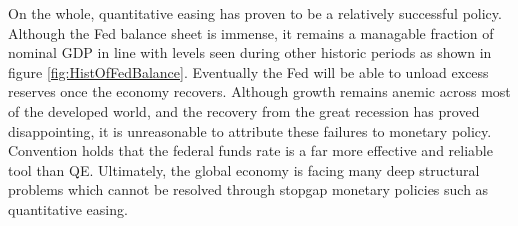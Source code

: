 \documentclass[12pt]{report}
\begin{document}
On the whole, quantitative easing has proven to be a relatively successful policy.
Although the Fed balance sheet is immense, it remains a managable fraction of nominal GDP in line with levels seen during other historic periods as shown in figure \ref{fig:HistOfFedBalance}.
Eventually the Fed will be able to unload excess reserves once the economy recovers.\autocite[4]{ricketts2014rise}
Although growth remains anemic across most of the developed world, and the recovery from the great recession has proved disappointing, it is unreasonable to attribute these failures to monetary policy.
Convention holds that the federal funds rate is a far more effective and reliable tool than QE.\autocite[465]{blinder2010quantitative}
Ultimately, the global economy is facing many deep structural problems which cannot be resolved through stopgap monetary policies such as quantitative easing.


\begin{appendices}



\end{appendices}

\nocite{*}
\printbibliography
\end{document}
